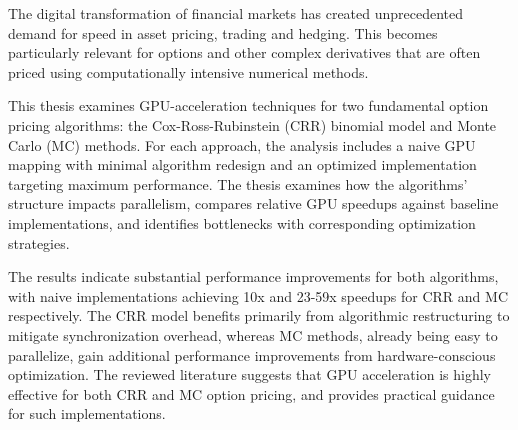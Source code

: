 \documentclass[english,12pt,a4paper,pdftex,sci,utf8]{aaltothesis}
\begin{document}
\begin{abstractpage}[english]
The digital transformation of financial markets has created unprecedented demand for speed in asset pricing, trading and hedging. This becomes particularly relevant for options and other complex derivatives that are often priced using computationally intensive numerical methods.

This thesis examines GPU-acceleration techniques for two fundamental option pricing algorithms: the Cox-Ross-Rubinstein (CRR) binomial model and Monte Carlo (MC) methods. For each approach, the analysis includes a naive GPU mapping with minimal algorithm redesign and an optimized implementation targeting maximum performance. The thesis examines how the algorithms' structure impacts parallelism, compares relative GPU speedups against baseline implementations, and identifies bottlenecks with corresponding optimization strategies.

The results indicate substantial performance improvements for both algorithms, with naive implementations achieving 10x and 23-59x speedups for CRR and MC respectively. The CRR model benefits primarily from algorithmic restructuring to mitigate synchronization overhead, whereas MC methods, already being easy to parallelize, gain additional performance improvements from hardware-conscious optimization. The reviewed literature suggests that GPU acceleration is highly effective for both CRR and MC option pricing, and provides practical guidance for such implementations. 
\end{abstractpage}

\newpage
%
\end{document}
